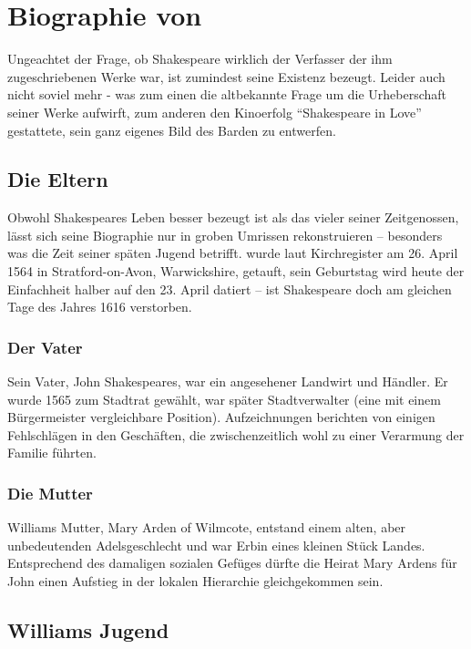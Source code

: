 \chapter{Biographie von \WS}

Ungeachtet der Frage, ob Shakespeare wirklich der Verfasser der ihm
zugeschriebenen Werke war, ist zumindest seine Existenz bezeugt. Leider auch
nicht soviel mehr - was zum einen die altbekannte Frage um die Urheberschaft
seiner Werke aufwirft, zum anderen den Kinoerfolg "`Shakespeare in Love"'
gestattete, sein ganz eigenes Bild des Barden zu entwerfen.

\section[Die Erzeuger]{Die Eltern}

Obwohl Shakespeares Leben besser bezeugt ist als das vieler seiner
Zeitgenossen, lässt sich seine Biographie nur in groben Umrissen rekonstruieren
-- besonders was die Zeit seiner späten Jugend betrifft. \WS
wurde laut Kirchregister am 26. April 1564 in Stratford-on-Avon, Warwickshire,
getauft, sein Geburtstag wird heute der Einfachheit halber auf den 23. April
datiert -- ist Shakespeare doch am gleichen Tage des Jahres 1616 verstorben.

\subsection{Der Vater}
Sein Vater, John Shakespeares, war ein angesehener Landwirt und Händler. Er
wurde 1565 zum Stadtrat gewählt, war später Stadtverwalter (eine mit einem
Bürgermeister vergleichbare Position). Aufzeichnungen berichten von einigen
Fehlschlägen in den Geschäften, die zwischenzeitlich wohl zu einer Verarmung
der Familie führten.

\subsection{Die Mutter}
Williams Mutter, Mary Arden of Wilmcote, entstand einem
alten, aber unbedeutenden Adelsgeschlecht und war Erbin eines kleinen Stück
Landes. Entsprechend des damaligen sozialen Gefüges dürfte die Heirat Mary
Ardens für John einen Aufstieg in der lokalen Hierarchie gleichgekommen sein.

\section{Williams Jugend}

